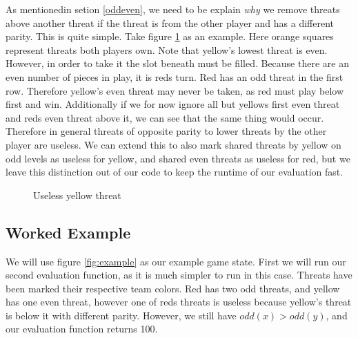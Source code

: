 \documentclass{article}
\newcommand{\rd}{\node [player, fill=red]{};}
\newcommand{\yw}{\node [player, fill=yellow] {};}
\newcommand{\gy}{\node [player, fill=white] {};}
\newcommand{\bt}{\node [threat, fill=orange!50] {};}
\begin{document}
As mentionedin setion \ref{oddeven}, we need to be explain \emph{why} we remove threats above another threat if the threat is from the other player and has a different parity. This is quite simple. Take figure \ref{threatblock} as an example. Here orange squares represent threats both players own. Note that yellow's lowest threat is even. However, in order to take it the slot beneath must be filled. Because there are an even number of pieces in play, it is reds turn. Red has an odd threat in the first row. Therefore yellow's even threat may never be taken, as red must play below first and win. Additionally if we for now ignore all but yellows first even threat and reds even threat above it, we can see that the same thing would occur. Therefore in general threats of opposite parity to lower threats by the other player are useless. We can extend this to also mark shared threats by yellow on odd levels as useless for yellow, and shared even threats as useless for red, but we leave this distinction out of our code to keep the runtime of our evaluation fast.
		
\begin{figure}[t]
	\centering
	\caption{Useless yellow threat}
	\label{threatblock}
\end{figure}
\subsection{Worked Example}
We will use figure \ref{fig:example} as our example game state. First we will run our second evaluation function, as it is much simpler to run in this case. Threats have been marked their respective team colors. Red has two odd threats, and yellow has one even threat, however one of reds threats is useless because yellow's threat is below it with different parity. However, we still have $odd(x) > odd(y)$, and our evaluation function returns 100.
	
\end{document}
